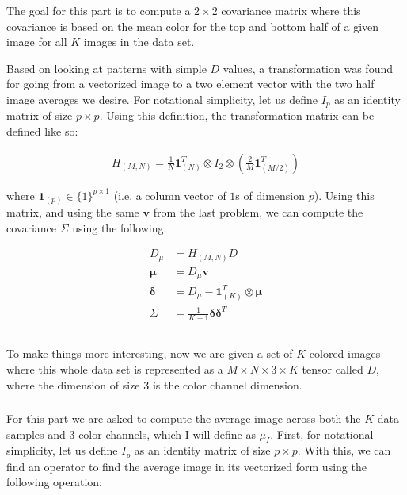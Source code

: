 \documentclass{article}[12pt]
\begin{document}
	\subsubsection{}
	The goal for this part is to compute a $2 \times 2$ covariance matrix where this covariance is based on the mean color for the top and bottom half of a given image for all $K$ images in the data set. 
	
	Based on looking at patterns with simple $D$ values, a transformation was found for going from a vectorized image to a two element vector with the two half image averages we desire. For notational simplicity, let us define $I_p$ as an identity matrix of size $p \times p$. Using this definition, the transformation matrix can be defined like so:
	
	\begin{align*}
	H_{(M,N)} = \frac{1}{N}\boldsymbol{1}_{(N)}^{T} \otimes I_2 \otimes \left( \frac{2}{M} \boldsymbol{1}_{(M/2)}^{T}\right)
	\end{align*}
	
	where $\boldsymbol{1}_{(p)} \in \{1 \}^{p \times 1}$ (i.e. a column vector of $1$s of dimension $p$). Using this matrix, and using the same $\boldsymbol{v}$ from the last problem, we can compute the covariance $\Sigma$ using the following:
	
	\begin{align*}
	D_{\mu} &= H_{(M,N)}D \\
	\boldsymbol{\mu} &= D_{\mu} \boldsymbol{v} \\
	\boldsymbol{\delta} &= D_{\mu} - \boldsymbol{1}_{(K)}^{T} \otimes \boldsymbol{\mu} \\
	\Sigma &= \frac{1}{K-1} \boldsymbol{\delta} \boldsymbol{\delta}^{T}
	\end{align*}
	
	\subsection{}
	To make things more interesting, now we are given a set of $K$ colored images where this whole data set is represented as a $M \times N \times 3 \times K$ tensor called $D$, where the dimension of size 3 is the color channel dimension.
	
	\subsubsection{}
	For this part we are asked to compute the average image across both the $K$ data samples and $3$ color channels, which I will define as $\mu_I$. First, for notational simplicity, let us define $I_p$ as an identity matrix of size $p \times p$. With this, we can find an operator to find the average image in its vectorized form using the following operation:
	
\end{document}
